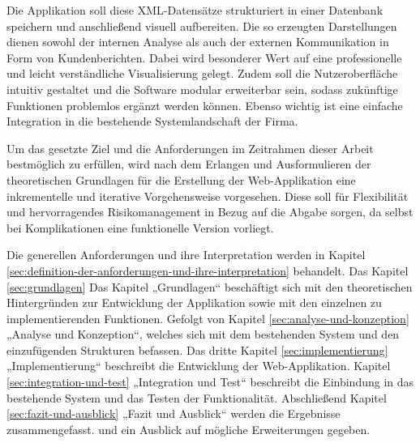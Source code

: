 Die Applikation soll diese XML-Datensätze strukturiert in
einer Datenbank speichern und anschließend visuell aufbereiten. Die so
erzeugten Darstellungen dienen sowohl der internen Analyse als auch der
externen Kommunikation in Form von Kundenberichten. Dabei wird besonderer Wert
auf eine professionelle und leicht verständliche Visualisierung gelegt. Zudem
soll die Nutzeroberfläche intuitiv gestaltet und die Software modular
erweiterbar sein, sodass zukünftige Funktionen problemlos ergänzt werden
können. Ebenso wichtig ist eine einfache Integration in die bestehende
Systemlandschaft der Firma.



Um das gesetzte Ziel und die Anforderungen im Zeitrahmen
dieser Arbeit bestmöglich zu erfüllen, wird nach dem Erlangen und
Ausformulieren der theoretischen Grundlagen für die Erstellung der
Web-Applikation eine inkrementelle und iterative Vorgehensweise vorgesehen.
Diese soll für Flexibilität und hervorragendes Risikomanagement in Bezug auf
die Abgabe sorgen, da selbst bei Komplikationen eine funktionelle Version
vorliegt.



Die generellen Anforderungen und ihre Interpretation werden
in Kapitel \ref{sec:definition-der-anforderungen-und-ihre-interpretation}
behandelt. Das Kapitel \ref{sec:grundlagen} Das Kapitel „Grundlagen“
beschäftigt sich mit den theoretischen Hintergründen zur Entwicklung der
Applikation sowie mit den einzelnen zu implementierenden Funktionen. Gefolgt
von Kapitel \ref{sec:analyse-und-konzeption} „Analyse und Konzeption“, welches
sich mit dem bestehenden System und den einzufügenden Strukturen befassen. Das
dritte Kapitel \ref{sec:implementierung} „Implementierung“ beschreibt die
Entwicklung der Web-Applikation. Kapitel \ref{sec:integration-und-test}
„Integration und Test“ beschreibt die Einbindung in das bestehende System und
das Testen der Funktionalität. Abschließend Kapitel
\ref{sec:fazit-und-ausblick} „Fazit und Ausblick“ werden die Ergebnisse
zusammengefasst. und ein Ausblick auf mögliche Erweiterungen gegeben.














